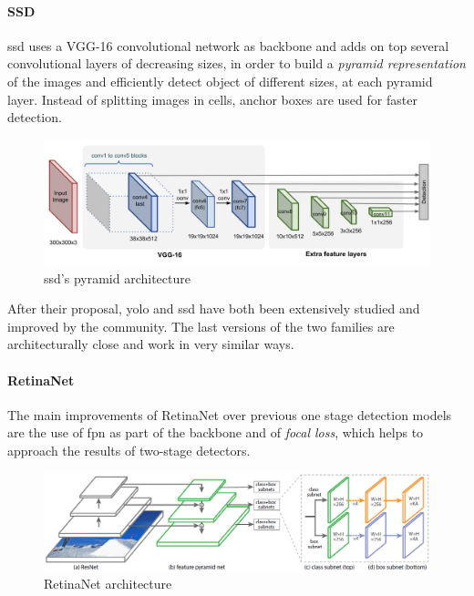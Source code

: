 \documentclass[%
    corpo=12pt,
    twoside,
    stile=classica,   
    tipotesi=magistrale,
    evenboxes,
    english,
	numerazioneromana,
]{toptesi}
\begin{document}
\paragraph{SSD}
\gls{ssd}\cite{Liu_2016} uses a VGG-16 convolutional network as backbone and adds on top several convolutional layers of decreasing sizes, in order to build a \textit{pyramid representation} of the images and efficiently detect object of different sizes, at each pyramid layer. Instead of splitting images in cells, anchor boxes are used for faster detection.

\begin{figure}[ht]
	\centering
	\includegraphics[width=.9\linewidth]{imgs/SSD-architecture.png}
	\caption{\acrshort{ssd}'s pyramid architecture\cite{objdetpart4}}
	\label{fig:ssd}
\end{figure}

After their proposal, \gls{yolo} and \gls{ssd} have both been extensively studied and improved by the community. The last versions of the two families are architecturally close and work in very similar ways.

\paragraph{RetinaNet}
The main improvements of RetinaNet\cite{lin2018focal} over previous one stage detection models are the use of \gls{fpn} as part of the backbone and of \textit{focal loss}, which helps to approach the results of two-stage detectors.

\begin{figure}[b]
	\centering
	\includegraphics[width=\linewidth]{imgs/retinanet.png}
	\caption{RetinaNet architecture\cite{lin2018focal}}
	\label{fig:retinanet}
\end{figure}
\end{document}
